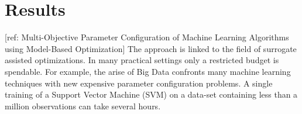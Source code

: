 


\section{Results}

[ref: Multi-Objective Parameter Configuration of Machine Learning Algorithms using Model-Based Optimization]
The approach is linked to the field of surrogate assisted optimizations. In many practical settings only a restricted budget is spendable. For example, the arise of Big Data confronts many machine learning techniques with new expensive parameter configuration problems. A single training of a Support Vector Machine (SVM) on a data-set containing less than a million observations can take several hours.